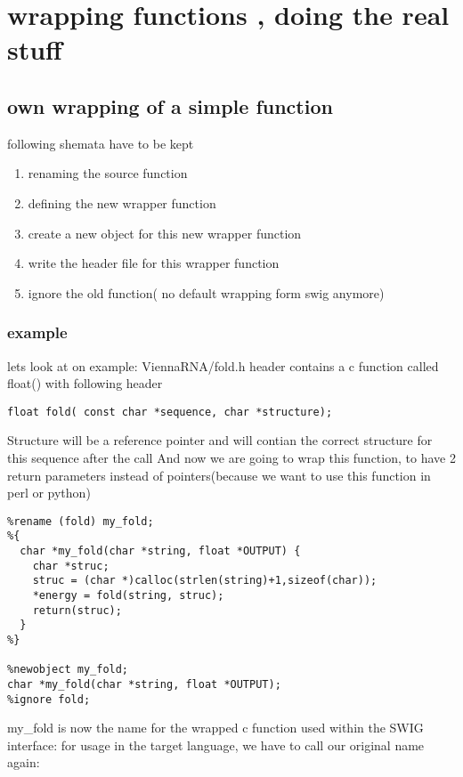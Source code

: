 \documentclass[ twoside,openright,titlepage,numbers=noenddot,headinclude,
                footinclude=true, cleardoublepage=empty,abstractoff, 
                BCOR=5mm,paper=a4,fontsize=11pt,
                ngerman,american,
                ]{scrreprt} %
\begin{document}
\chapter{wrapping functions , doing the real stuff}
\section{own wrapping of a simple function}
following shemata have to be kept
\begin{enumerate}
\item renaming the source function
\item defining the new wrapper function
\item create a new object for this new wrapper function
\item write the header file for this wrapper function
\item ignore the old function( no default wrapping form swig anymore)
\end{enumerate}

\subsection{example}
lets look at on example:
ViennaRNA/fold.h header contains a c function called float() with following header

\begin{lstlisting}
float fold( const char *sequence, char *structure);
\end{lstlisting}

Structure will be a reference pointer and will contian the correct structure for this sequence after the call
And now we are going to wrap this function, to have 2 return parameters instead of pointers(because we want to use this function in perl or python)

\begin{lstlisting}
%rename (fold) my_fold;
%{
  char *my_fold(char *string, float *OUTPUT) {
    char *struc;
    struc = (char *)calloc(strlen(string)+1,sizeof(char));
    *energy = fold(string, struc);
    return(struc);
  }
%}

%newobject my_fold;
char *my_fold(char *string, float *OUTPUT);
%ignore fold;

\end{lstlisting}

my\_fold is now the name for the wrapped c function used within the SWIG interface: for usage in the target language, we have to call our original name again:
\end{document}
